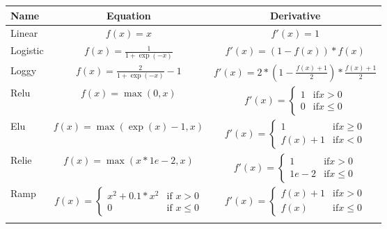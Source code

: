 \begin{table*}
\centering
\begin{adjustbox}{max width=\textwidth}
\begin{tabular}{lcc}
\hline %
\textbf{Name} & \textbf{Equation} & \textbf{Derivative} \\
\hline

Linear   &  $f(x) = x$                              &  $f'(x) = 1$                                                                                           \\

Logistic &  $f(x) = \frac{1}{1 + \exp(-x)}$         &  $f'(x) = (1 - f(x)) * f(x)$                                                                           \\

Loggy    &  $f(x) = \frac{2}{1 + \exp(-x)} - 1$     &  $f'(x) = 2 * (1 - \frac{f(x) + 1}{2}) * \frac{f(x) + 1}{2} $                                          \\

Relu     &  $f(x) = \max(0, x)$                     &  $f'(x) = \left\{\begin{array}{rl} 1   & \mbox{if}  x > 0 \\0    & \mbox{if}  x\leq0 \end{array}\right.$ \\

Elu      &  $f(x) = \max(\exp(x) - 1, x)$           &  $f'(x) = \left\{\begin{array}{rl} 1   & \mbox{if} x\geq0\\f(x)+1  & \mbox{if} x<0    \end{array}\right.$ \\

Relie    &  $f(x) = \max(x * 1e-2, x) $             &  $f'(x) = \left\{\begin{array}{rl} 1   & \mbox{if} x>0   \\1e-2 & \mbox{if} x\leq0 \end{array}\right.$ \\

Ramp     &  $f(x) = \left\{\begin{array}{rl} 
                            x^{2} + 0.1 * x^{2} &  \mbox{if } x>0\\
                            0                   &  \mbox{if } x\leq0 
                           \end{array}\right.$
                                                    &  $f'(x) = \left\{\begin{array}{rl} f(x)+1 & \mbox{if} x>0   \\ f(x)   & \mbox{if} x\leq0 \end{array}\right.$ \\ \\


\end{tabular}
\end{adjustbox}
\end{table*}
